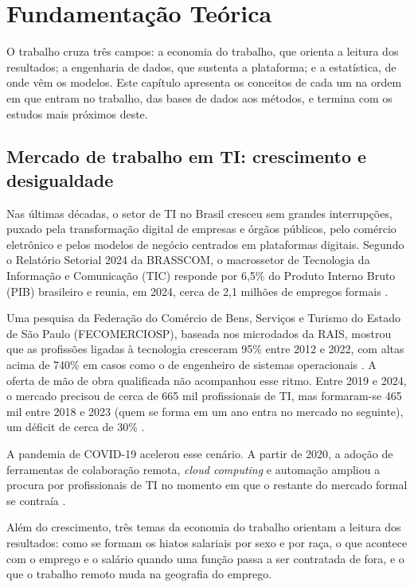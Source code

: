 
\chapter{Fundamentação Teórica}
\label{cap:referencial}

O trabalho cruza três campos: a economia do trabalho, que orienta a leitura dos resultados; a engenharia de dados, que sustenta a plataforma; e a estatística, de onde vêm os modelos. Este capítulo apresenta os conceitos de cada um na ordem em que entram no trabalho, das bases de dados aos métodos, e termina com os estudos mais próximos deste.

\section{Mercado de trabalho em TI: crescimento e desigualdade}

Nas últimas décadas, o setor de TI no Brasil cresceu sem grandes interrupções, puxado pela transformação digital de empresas e órgãos públicos, pelo comércio eletrônico e pelos modelos de negócio centrados em plataformas digitais. Segundo o Relatório Setorial 2024 da BRASSCOM, o macrossetor de Tecnologia da Informação e Comunicação (TIC) responde por 6,5\% do Produto Interno Bruto (PIB) brasileiro e reunia, em 2024, cerca de 2,1 milhões de empregos formais \cite{Brasscom2024}.

Uma pesquisa da Federação do Comércio de Bens, Serviços e Turismo do Estado de São Paulo (FECOMERCIOSP), baseada nos microdados da RAIS, mostrou que as profissões ligadas à tecnologia cresceram 95\% entre 2012 e 2022, com altas acima de 740\% em casos como o de engenheiro de sistemas operacionais \cite{Fecomercio2024}. A oferta de mão de obra qualificada não acompanhou esse ritmo. Entre 2019 e 2024, o mercado precisou de cerca de 665 mil profissionais de TI, mas formaram-se 465 mil entre 2018 e 2023 (quem se forma em um ano entra no mercado no seguinte), um déficit de cerca de 30\% \cite{Brasscom2025}.

A pandemia de COVID-19 acelerou esse cenário. A partir de 2020, a adoção de ferramentas de colaboração remota, \textit{cloud computing} e automação ampliou a procura por profissionais de TI no momento em que o restante do mercado formal se contraía \cite{CAGED2024}.

\label{sec:literatura-trabalho}
Além do crescimento, três temas da economia do trabalho orientam a leitura dos resultados: como se formam os hiatos salariais por sexo e por raça, o que acontece com o emprego e o salário quando uma função passa a ser contratada de fora, e o que o trabalho remoto muda na geografia do emprego.

